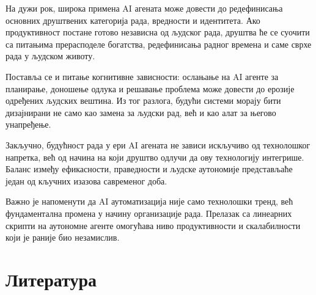 На дужи рок, широка примена AI агената може довести до редефинисања основних друштвених категорија рада, вредности и идентитета. Ако продуктивност постане готово независна од људског рада, друштва ће се суочити са питањима прерасподеле богатства, редефинисања радног времена и саме сврхе рада у људском животу.

Поставља се и питање когнитивне зависности: ослањање на AI агенте за планирање, доношење одлука и решавање проблема може довести до ерозије одређених људских вештина. Из тог разлога, будући системи морају бити дизајнирани не само као замена за људски рад, већ и као алат за његово унапређење.

Закључно, будућност рада у ери AI агената не зависи искључиво од технолошког напретка, већ од начина на који друштво одлучи да ову технологију интегрише. Баланс између ефикасности, праведности и људске аутономије представљаће један од кључних изазова савременог доба.

Важно је напоменути да AI аутоматизација није само технолошки тренд, већ фундаментална промена у начину организације рада. Прелазак са линеарних скрипти на аутономне агенте омогућава ниво продуктивности и скалабилности који је раније био незамислив.




\section{Литература}
\printbibliography[heading=none]
